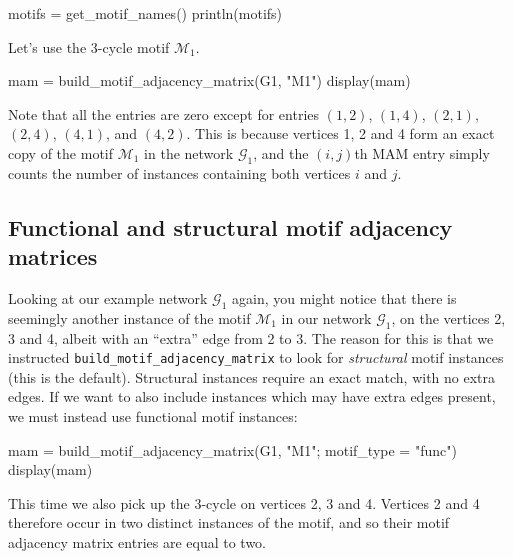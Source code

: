 \documentclass{article}
\begin{document}
\begin{tcolorbox}[colback=black!5!white,colframe=black!15!white]
\begin{juliablock}
motifs = get_motif_names()
println(motifs)
\end{juliablock}
\texttt{\obeylines\printpythontex}
\end{tcolorbox}

Let's use the 3-cycle motif $\mathcal{M}_1$.

\begin{tcolorbox}[colback=black!5!white,colframe=black!15!white]
\begin{juliablock}
mam = build_motif_adjacency_matrix(G1, "M1")
display(mam)
\end{juliablock}
\texttt{\obeylines\printpythontex}
\end{tcolorbox}

Note that all the entries are zero except for entries
$(1,2)$,
$(1,4)$,
$(2,1)$,
$(2,4)$,
$(4,1)$,
and
$(4,2)$.
This is because vertices 1, 2 and 4 form an exact copy of
the motif $\mathcal{M}_1$ in the network $\mathcal{G}_1$,
and the  $(i,j)$th MAM entry simply counts the number of instances
containing both vertices $i$ and $j$.

\subsection{Functional and structural motif adjacency matrices}

Looking at our example network $\mathcal{G}_1$ again,
you might notice that there is seemingly another instance
of the motif $\mathcal{M}_1$
in our network $\mathcal{G}_1$,
on the vertices 2, 3 and 4,
albeit with an ``extra'' edge from 2 to 3.
The reason for this is that we instructed
\texttt{build\_motif\_adjacency\_matrix}
to look for \emph{structural} motif instances (this is the default).
Structural instances require an exact match, with no extra edges.
If we want to also include instances which may have extra edges present,
we must instead use functional motif instances:

\begin{tcolorbox}[colback=black!5!white,colframe=black!15!white]
\begin{juliablock}
mam = build_motif_adjacency_matrix(G1, "M1"; motif_type = "func")
display(mam)
\end{juliablock}
\texttt{\obeylines\printpythontex}
\end{tcolorbox}

This time we also pick up the 3-cycle on vertices 2, 3 and 4.
Vertices 2 and 4 therefore occur in two distinct instances
of the motif, and so their motif adjacency matrix entries are equal
to two.
\end{document}
